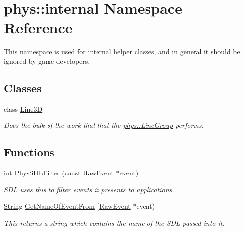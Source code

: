 \hypertarget{namespacephys_1_1internal}{
\section{phys::internal Namespace Reference}
\label{d0/d26/namespacephys_1_1internal}
}


This namespace is used for internal helper classes, and in general it should be ignored by game developers.  


\subsection*{Classes}
\begin{DoxyCompactItemize}
\item 
class \hyperlink{classphys_1_1internal_1_1Line3D}{Line3D}
\begin{DoxyCompactList}\small\item\em Does the bulk of the work that that the \hyperlink{classphys_1_1LineGroup}{phys::LineGroup} performs. \item\end{DoxyCompactList}\end{DoxyCompactItemize}
\subsection*{Functions}
\begin{DoxyCompactItemize}
\item 
int \hyperlink{namespacephys_1_1internal_aae2a1133a05c67ac3062038c0c5dad4a}{PhysSDLFilter} (const \hyperlink{namespacephys_a8126d26e4507e66d09876988bb941fd4}{RawEvent} $\ast$event)
\begin{DoxyCompactList}\small\item\em SDL uses this to filter events it presents to applications. \item\end{DoxyCompactList}\item 
\hyperlink{namespacephys_aa03900411993de7fbfec4789bc1d392e}{String} \hyperlink{namespacephys_1_1internal_a8ca9bdbec082de74b347496001b9615f}{GetNameOfEventFrom} (\hyperlink{namespacephys_a8126d26e4507e66d09876988bb941fd4}{RawEvent} $\ast$event)
\begin{DoxyCompactList}\small\item\em This returns a string which contains the name of the SDL passed into it. \item\end{DoxyCompactList}\end{DoxyCompactItemize}


